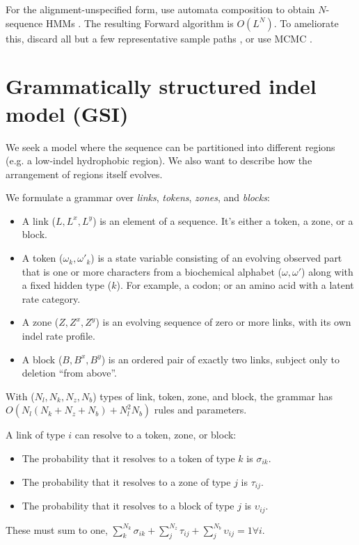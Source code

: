 \documentclass{article}
\begin{document}
For the alignment-unspecified form, use automata composition to obtain $N$-sequence HMMs \cite{SilvestreRyanEtAl2020}.
The resulting Forward algorithm is $O(L^N)$.
To ameliorate this, discard all but a few representative sample paths \cite{WestessonEtAl2012},
or use MCMC \cite{RedelingsSuchard2007}.


\section{Grammatically structured indel model (GSI)}

We seek a model where the sequence can be partitioned into different regions (e.g. a low-indel hydrophobic region).
We also want to describe how the arrangement of regions itself evolves.

We formulate a grammar over {\em links}, {\em tokens}, {\em zones}, and {\em blocks}:
\begin{itemize}
\item A link ($L,L^x,L^y$) is an element of a sequence. It's either a token, a zone, or a block.
\item A token ($\omega_k, \omega'_k$) is a state variable consisting of an evolving observed part that is one or more characters from a biochemical alphabet ($\omega, \omega'$)
  along with a fixed hidden type ($k$). For example, a codon; or an amino acid with a latent rate category.
\item A zone ($Z,Z^x,Z^y$) is an evolving sequence of zero or more links, with its own indel rate profile.
\item A block ($B,B^x,B^y$) is an ordered pair of exactly two links, subject only to deletion ``from above''.
\end{itemize}

With ($N_l,N_k,N_z,N_b$) types of link, token, zone, and block,
the grammar has $O(N_l(N_k + N_z + N_b) + N_l^2 N_b)$ rules and parameters.

A link of type $i$ can resolve to a token, zone, or block:
\begin{itemize}
\item
The probability that it resolves to a token of type $k$ is $\sigma_{ik}$.
\item
The probability that it resolves to a zone of type $j$ is $\tau_{ij}$.
\item
The probability that it resolves to a block of type $j$ is $\upsilon_{ij}$.
\end{itemize}
These must sum to one, $\sum_k^{N_k}\sigma_{ik} + \sum_j^{N_z}\tau_{ij} + \sum_j^{N_b}\upsilon_{ij} = 1 \forall i$.
\end{document}
